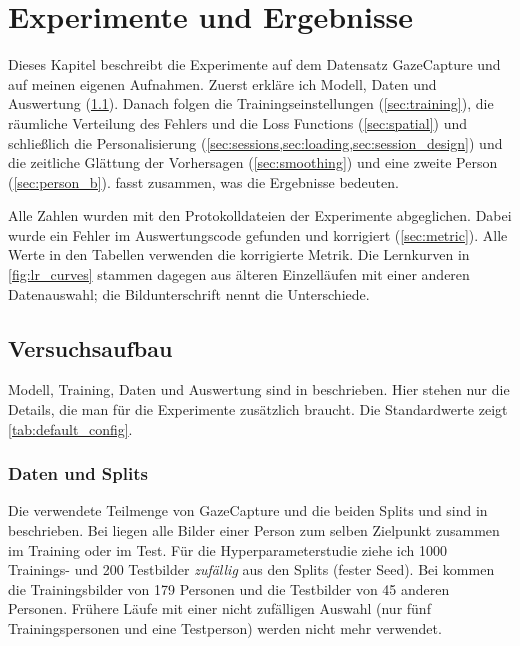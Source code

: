 \chapter{Experimente und Ergebnisse}
\label{ch:results}

Dieses Kapitel beschreibt die Experimente auf dem Datensatz GazeCapture
\cite{krafka2016itracker} und auf meinen eigenen Aufnahmen. Zuerst erkläre ich
Modell, Daten und Auswertung (\cref{sec:setup}). Danach folgen die
Trainingseinstellungen (\cref{sec:training}), die räumliche Verteilung des
Fehlers und die Loss Functions (\cref{sec:spatial}) und schließlich die
Personalisierung (\cref{sec:sessions,sec:loading,sec:session_design}) und
die zeitliche Glättung der Vorhersagen (\cref{sec:smoothing}) und eine zweite
Person (\cref{sec:person_b}).
 fasst zusammen, was die Ergebnisse bedeuten.

Alle Zahlen wurden mit den Protokolldateien der Experimente abgeglichen. Dabei
wurde ein Fehler im Auswertungscode gefunden und korrigiert (\cref{sec:metric}).
Alle Werte in den Tabellen verwenden die korrigierte Metrik. Die Lernkurven in
\cref{fig:lr_curves} stammen dagegen aus älteren Einzelläufen mit einer anderen
Datenauswahl; die Bildunterschrift nennt die Unterschiede.

\section{Versuchsaufbau}
\label{sec:setup}

Modell, Training, Daten und Auswertung sind in  beschrieben. Hier stehen nur die Details, die man für die
Experimente zusätzlich braucht. Die Standardwerte zeigt
\cref{tab:default_config}.

\subsection{Daten und Splits}
\label{sec:data}

Die verwendete Teilmenge von GazeCapture und die beiden Splits
 und  sind in
 beschrieben. Bei  liegen alle Bilder einer Person zum
selben Zielpunkt zusammen im Training oder im Test. Für die Hyperparameterstudie ziehe ich \num{1000} Trainings- und \num{200}
Testbilder \emph{zufällig} aus den Splits (fester Seed). Bei  kommen die Trainingsbilder
von 179 Personen und die Testbilder von 45 anderen Personen. Frühere Läufe
mit einer nicht zufälligen Auswahl (nur fünf Trainingspersonen und eine
Testperson) werden nicht mehr verwendet.

